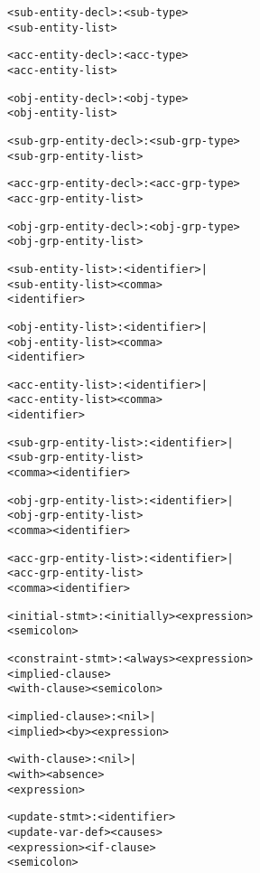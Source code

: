 \documentclass[11pt]{report}
\newenvironment{vverbatim}
{
  \begin{alltt}
}
{
    \vspace{-\baselineskip}
  \end{alltt}
}
\begin{document}
\begin{vverbatim}
<sub-entity-decl>        : <sub-type>
                           <sub-entity-list>

<acc-entity-decl>        : <acc-type>
                           <acc-entity-list>

<obj-entity-decl>        : <obj-type>
                           <obj-entity-list>

<sub-grp-entity-decl>    : <sub-grp-type>
                           <sub-grp-entity-list>

<acc-grp-entity-decl>    : <acc-grp-type>
                           <acc-grp-entity-list>

<obj-grp-entity-decl>    : <obj-grp-type>
                           <obj-grp-entity-list>

<sub-entity-list>        : <identifier> |
                           <sub-entity-list> <comma>
                           <identifier>

<obj-entity-list>        : <identifier> |
                           <obj-entity-list> <comma>
                           <identifier>

<acc-entity-list>        : <identifier> |
                           <acc-entity-list> <comma>
                           <identifier>

<sub-grp-entity-list>    : <identifier> |
                           <sub-grp-entity-list>
                           <comma> <identifier>

<obj-grp-entity-list>    : <identifier> |
                           <obj-grp-entity-list>
                           <comma> <identifier>

<acc-grp-entity-list>    : <identifier> |
                           <acc-grp-entity-list>
                           <comma> <identifier>

<initial-stmt>           : <initially> <expression>
                           <semicolon>

<constraint-stmt>        : <always> <expression>
                           <implied-clause>
                           <with-clause> <semicolon>

<implied-clause>         : <nil> |
                           <implied> <by> <expression>

<with-clause>            : <nil> |
                           <with> <absence>
                           <expression>

<update-stmt>            : <identifier>
                           <update-var-def> <causes>
                           <expression> <if-clause>
                           <semicolon>


\end{vverbatim}
\end{document}

